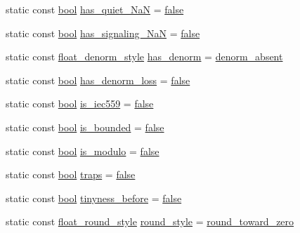\begin{DoxyCompactItemize}
\item 
static const \hyperlink{compiler_8h_abb452686968e48b67397da5f97445f5b}{bool} \hyperlink{class__Numeric__limits__base_a68eb436f33988d414059656bee941358}{has\+\_\+quiet\+\_\+\+Na\+N} = \hyperlink{compiler_8h_a65e9886d74aaee76545e83dd09011727}{false}
\item 
static const \hyperlink{compiler_8h_abb452686968e48b67397da5f97445f5b}{bool} \hyperlink{class__Numeric__limits__base_a48cb53c83c521d6c3afb3d6c6990bb00}{has\+\_\+signaling\+\_\+\+Na\+N} = \hyperlink{compiler_8h_a65e9886d74aaee76545e83dd09011727}{false}
\item 
static const \hyperlink{limits-hack_8h_a592fe78d9bf66455d12aa075f36313b6}{float\+\_\+denorm\+\_\+style} \hyperlink{class__Numeric__limits__base_a645bb7fcdd0c7fa22e50708a4c1724de}{has\+\_\+denorm} = \hyperlink{limits-hack_8h_a592fe78d9bf66455d12aa075f36313b6ae1126f121e8e78fad4c2ea93b9154f70}{denorm\+\_\+absent}
\item 
static const \hyperlink{compiler_8h_abb452686968e48b67397da5f97445f5b}{bool} \hyperlink{class__Numeric__limits__base_a7bdcbb39f7870da9e300fceb0a38cb36}{has\+\_\+denorm\+\_\+loss} = \hyperlink{compiler_8h_a65e9886d74aaee76545e83dd09011727}{false}
\item 
static const \hyperlink{compiler_8h_abb452686968e48b67397da5f97445f5b}{bool} \hyperlink{class__Numeric__limits__base_a840e40576b7fffa76b4f5776f8a7a4f1}{is\+\_\+iec559} = \hyperlink{compiler_8h_a65e9886d74aaee76545e83dd09011727}{false}
\item 
static const \hyperlink{compiler_8h_abb452686968e48b67397da5f97445f5b}{bool} \hyperlink{class__Numeric__limits__base_a67438daf1037ca71c464eec39a06ea89}{is\+\_\+bounded} = \hyperlink{compiler_8h_a65e9886d74aaee76545e83dd09011727}{false}
\item 
static const \hyperlink{compiler_8h_abb452686968e48b67397da5f97445f5b}{bool} \hyperlink{class__Numeric__limits__base_a30c9455262bca36bd81bb19416b5c3c9}{is\+\_\+modulo} = \hyperlink{compiler_8h_a65e9886d74aaee76545e83dd09011727}{false}
\item 
static const \hyperlink{compiler_8h_abb452686968e48b67397da5f97445f5b}{bool} \hyperlink{class__Numeric__limits__base_a540e2f26a588908be3b5cb1c52b9406b}{traps} = \hyperlink{compiler_8h_a65e9886d74aaee76545e83dd09011727}{false}
\item 
static const \hyperlink{compiler_8h_abb452686968e48b67397da5f97445f5b}{bool} \hyperlink{class__Numeric__limits__base_a33e6e73154533a827289298c8298a6ec}{tinyness\+\_\+before} = \hyperlink{compiler_8h_a65e9886d74aaee76545e83dd09011727}{false}
\item 
static const \hyperlink{limits-hack_8h_a3bdaf6c7e8a65859bf550443989c5a66}{float\+\_\+round\+\_\+style} \hyperlink{class__Numeric__limits__base_a1fcd74812fb460513c9ec0d0fae0f41b}{round\+\_\+style} = \hyperlink{limits-hack_8h_a3bdaf6c7e8a65859bf550443989c5a66a2378935a2849c4d049d5e5a01324e827}{round\+\_\+toward\+\_\+zero}
\end{DoxyCompactItemize}


